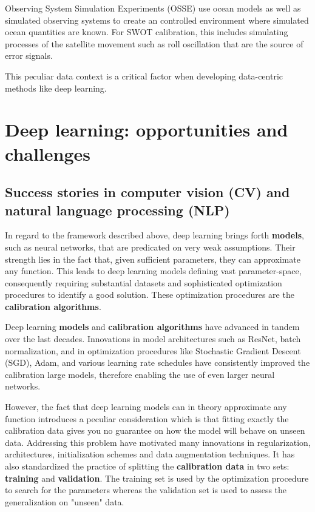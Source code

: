 \begin{bibunit}
Observing System Simulation Experiments (OSSE)\cite{verrierAssessingImpactMultiple2017} use ocean models as well as simulated observing systems to create an controlled environment where simulated ocean quantities are known. For SWOT calibration, this includes simulating processes of the satellite movement such as roll oscillation that are the source of error signals\cite{EmpiricalCrossCalibrationCoherent}.

This peculiar data context is a critical factor when developing data-centric methods like deep learning.

% 

\section{Deep learning: opportunities and challenges}

\subsection*{Success stories in computer vision (CV) and natural language processing (NLP)}

In regard to the framework described above, deep learning brings forth \textbf{models}, such as neural networks, that are predicated on very weak assumptions. Their strength lies in the fact that, given sufficient parameters, they can approximate any function\cite{hornikMultilayerFeedforwardNetworks1989}. This leads to deep learning models defining vast parameter-space, consequently requiring substantial datasets and sophisticated optimization procedures to identify a good solution. These optimization procedures are the \textbf{calibration algorithms}.

Deep learning \textbf{models} and \textbf{calibration algorithms} have advanced in tandem over the last decades.
Innovations in model architectures such as ResNet\cite{heDeepResidualLearning2016}, batch normalization\cite{ioffeBatchNormalizationAccelerating2015}, and in optimization procedures like Stochastic Gradient Descent (SGD)\cite{summaLargeScaleMachineLearning2011}, Adam\cite{kingmaAdamMethodStochastic2017}, and various learning rate schedules have consistently improved the calibration large models, therefore enabling the use of even larger neural networks. 

However, the fact that deep learning models can in theory approximate any function introduces a peculiar consideration which is that fitting exactly the calibration data gives you no guarantee on how the model will behave on unseen data.
Addressing this problem have motivated many innovations in regularization, architectures, initialization schemes and data augmentation techniques.
It has also standardized the practice of splitting the \textbf{calibration data} in two sets: \textbf{training} and \textbf{validation}.
The training set is used by the optimization procedure to search for the parameters whereas the validation set is used to assess the generalization on "unseen" data.


\end{bibunit}
